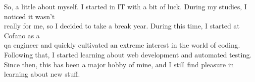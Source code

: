 \documentclass[9pt]{developercv} %
\begin{document}
    \begin{minipage}[t]{0.4\textwidth} %
        \vspace{-\baselineskip} %

        {
            So, a little about myself. I started in IT with a bit of luck. During my studies, I noticed it wasn't \\
            really for me, so I decided to take a break year.
            During this time, I started at Cofano as a \\
            qa engineer and quickly cultivated an extreme interest in the world of coding. \\
            Following that, I started learning about web development and automated testing.
            Since then, this has been a major hobby of mine, and I still find pleasure in learning about new stuff.
        }

    \end{minipage}
    \hfill %
    \begin{minipage}[t]{0.5\textwidth} %
        \vspace{-\baselineskip} %
        \begin{barchart}{5.5}
        \end{barchart}
    \end{minipage}


\end{document}
